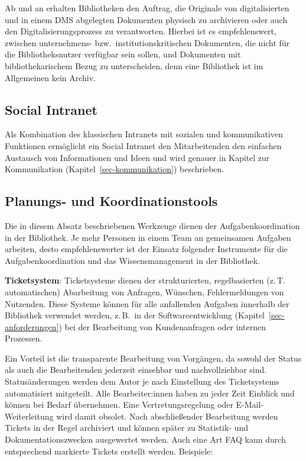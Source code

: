 \documentclass[
  11pt,
  letterpaper,
  DIV=11,
  twoside]{scrreprt}
\begin{document}
Ab und an erhalten Bibliotheken den Auftrag, die Originale von
digitalisierten und in einem DMS abgelegten Dokumenten physisch zu
archivieren oder auch den Digitalisierungsprozess zu verantworten.
Hierbei ist es empfehlenswert, zwischen unternehmens-
bzw.~institutionskritischen Dokumenten, die nicht für die
Bibliotheksnutzer verfügbar sein sollen, und Dokumenten mit
bibliothekarischem Bezug zu unterscheiden, denn eine Bibliothek ist im
Allgemeinen kein Archiv.

\subsection{Social Intranet}\label{social-intranet}

Als Kombination des klassischen Intranets mit sozialen und
kommunikativen Funktionen ermöglicht ein Social Intranet den
Mitarbeitenden den einfachen Austausch von Informationen und Ideen und
wird genauer in Kapitel zur Kommunikation
(Kapitel~\ref{sec-kommunikation}) beschrieben.

\subsection{Planungs- und Koordinationstools}\label{sec-planungstools}

Die in diesem Absatz beschriebenen Werkzeuge dienen der
Aufgabenkoordination in der Bibliothek. Je mehr Personen in einem Team
an gemeinsamen Aufgaben arbeiten, desto empfehlenswerter ist der Einsatz
folgender Instrumente für die Aufgabenkoordination und das
Wissensmanagement in der Bibliothek.

\textbf{Ticketsystem}: Ticketsysteme dienen der strukturierten,
regelbasierten (z.\,T. automatischen) Abarbeitung von Anfragen,
Wünschen, Fehlermeldungen von Nutzenden. Diese Systeme können für alle
anfallenden Aufgaben innerhalb der Bibliothek verwendet werden,
z.\,B.~in der Softwareentwicklung (Kapitel~\ref{sec-anforderungen}) bei
der Bearbeitung von Kundenanfragen oder internen Prozessen.

Ein Vorteil ist die transparente Bearbeitung von Vorgängen, da sowohl
der Status als auch die Bearbeitenden jederzeit einsehbar und
nachvollziehbar sind. Statusänderungen werden dem Autor je nach
Einstellung des Ticketsystems automatisiert mitgeteilt. Alle
Bearbeiter:innen haben zu jeder Zeit Einblick und können bei Bedarf
übernehmen. Eine Vertretungsregelung oder E-Mail-Weiterleitung wird
damit obsolet. Nach abschließender Bearbeitung werden Tickets in der
Regel archiviert und können später zu Statistik- und
Dokumentationszwecken ausgewertet werden. Auch eine Art FAQ kann durch
entsprechend markierte Tickets erstellt werden. Beispiele:
\end{document}
